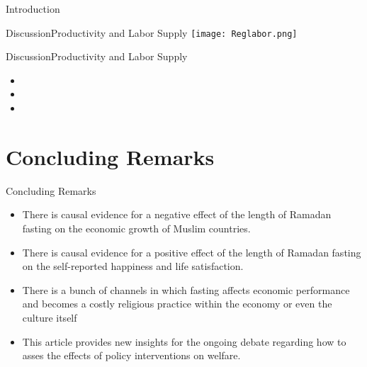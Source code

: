 \documentclass[pdftex,12pt,xcolor=pdftex,table]{beamer}
\begin{document}
\begin{frame}{Introduction}
    \begin{frame}{Discussion}{Productivity and Labor Supply}
    \vspace{-0.5cm}
    \centering\texttt{[image: Reglabor.png]}
    \end{frame}
    
    \begin{frame}{Discussion}{Productivity and Labor Supply}
    \begin{itemize}
        \item {}
        \item {}
        \item {}
        
        \vspace{0.5cm}
    \end{itemize}
    \end{frame}
    

\section{Concluding Remarks}
    \begin{frame}{Concluding Remarks}
    
    \begin{itemize}
        \item<1-> There is causal evidence for a negative effect of the length of Ramadan fasting on the economic growth of Muslim countries.
        \item<2-> There is causal evidence for a positive effect of the length of Ramadan fasting on the self-reported happiness and life satisfaction.
        \item<3-> There is a bunch of channels in which fasting affects economic performance and becomes a costly religious practice within the economy or even the culture itself
        \item<4> This article provides new insights for the ongoing debate regarding how to asses the effects of policy interventions on welfare.
    \end{itemize}
        

\end{frame}
\end{frame}
\end{document}
